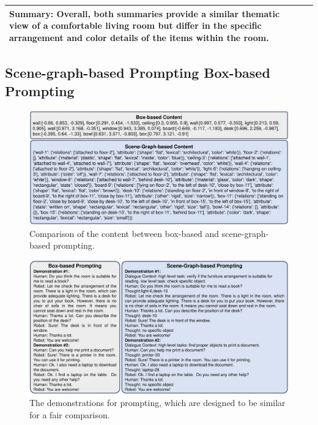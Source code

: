 \begin{table}[t!]
\begin{tabular}{l|p{10cm}}
\textbf{Summary:} Overall, both summaries provide a similar thematic view of a comfortable living room but differ in the specific arrangement and color details of the items within the room.
\\
        \bottomrule
    \end{tabular}
    \label{tab:subgraph_analysis}
\end{table}


\subsection{Scene-graph-based Prompting \vs Box-based Prompting}
\label{sec:scene graph prompting and bbox prompting}

\begin{figure}[t!]
\centering
\includegraphics[width=\textwidth, keepaspectratio]{figs/dialogue_compare_content.pdf}%
  \caption{Comparison of the content between box-based and scene-graph-based prompting.}
  \label{fig:prompt:compare_content}
\end{figure}

\begin{figure}[t!]
\centering
\includegraphics[width=\textwidth, keepaspectratio]{figs/dialogue_compare_demonstrations.pdf}%
  \caption{The demonstrations for prompting, which are designed to be similar for a fair comparison.}
  \label{fig:prompt:compare_demonstrations}
\end{figure}

